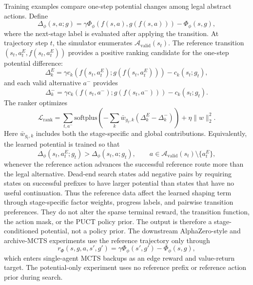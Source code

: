 \documentclass{article}
\begin{document}
Training examples compare one-step potential changes among legal abstract
actions.  Define
\[
  \Delta_\phi(s,a;g)
  =
  \gamma\Phi_\phi(f(s,a),g(f(s,a)))-\Phi_\phi(s,g),
\]
where the next-stage label is evaluated after applying the transition.  At trajectory step
\(t\), the simulator enumerates
\(\mathcal A_{\mathrm{valid}}(s_t)\).  The reference transition
\((s_t,a^E_t,f(s_t,a^E_t))\) provides
a positive ranking candidate for the one-step potential difference:
\[
  \Delta_k^E =
  \gamma c_k(f(s_t,a^E_t);g(f(s_t,a^E_t)))-c_k(s_t;g_t),
\]
and each valid alternative \(a^-\) provides
\[
  \Delta_k^- =
  \gamma c_k(f(s_t,a^-);g(f(s_t,a^-)))-c_k(s_t;g_t).
\]
The ranker optimizes
\[
  \mathcal L_{\mathrm{rank}}
  =
  \sum_{t,a^-}
  \mathrm{softplus}\left(
  -\sum_k \bar w_{g_t,k}(\Delta_k^E-\Delta_k^-)
  \right)
  +\eta\|w\|_2^2.
\]
Here \(\bar w_{g_t,k}\) includes both the stage-specific and global
contributions.
Equivalently, the learned potential is trained so that
\[
  \Delta_\phi(s_t,a^E_t;g_t)
  >
  \Delta_\phi(s_t,a;g_t),
  \qquad
  a\in\mathcal A_{\mathrm{valid}}(s_t)\setminus\{a^E_t\},
\]
whenever the reference action advances the successful reference route more than
the legal alternative.  Dead-end search states add negative pairs by requiring
states on successful prefixes to have larger potential than states that have no
useful continuation.  Thus the reference data affect the learned shaping term
through stage-specific factor weights, progress labels, and pairwise transition
preferences.  They do not alter the sparse terminal reward, the transition
function, the action mask, or the PUCT policy prior.
The output is therefore a stage-conditioned potential, not a policy prior.
The downstream AlphaZero-style and archive-MCTS experiments use the
reference trajectory only
through
\[
  r_{\Phi}(s,g,a,s',g')=\gamma\Phi_\phi(s',g')-\Phi_\phi(s,g),
\]
  which enters single-agent MCTS backups as an edge reward and value-return
target.  The potential-only experiment uses no reference prefix or reference
action prior during search.
\end{document}
